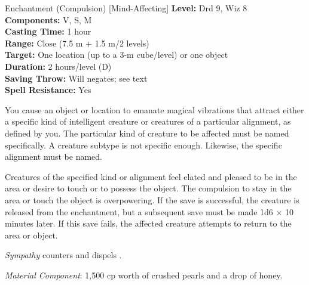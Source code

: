 {Enchantment (Compulsion) [Mind-Affecting]}
{
	\textbf{Level:}
	Drd 9, Wiz 8\\
	\textbf{Components:}
	V, S, M\\
	\textbf{Casting Time:}
	1 hour\\
	\textbf{Range:}
	Close (7.5 m + 1.5 m/2 levels)\\
	\textbf{Target:}
	One location (up to a 3-m cube/level) or one object\\
	\textbf{Duration:}
	2 hours/level (D)\\
	\textbf{Saving Throw:}
	Will negates; see text\\
	\textbf{Spell Resistance:}
	Yes\\
}
{
	You cause an object or location to emanate magical vibrations that attract either a specific kind of intelligent creature or creatures of a particular alignment, as defined by you. The particular kind of creature to be affected must be named specifically. A creature subtype is not specific enough. Likewise, the specific alignment must be named.

	Creatures of the specified kind or alignment feel elated and pleased to be in the area or desire to touch or to possess the object. The compulsion to stay in the area or touch the object is overpowering. If the save is successful, the creature is released from the enchantment, but a subsequent save must be made 1d6 $\times$ 10 minutes later. If this save fails, the affected creature attempts to return to the area or object.

	\emph{Sympathy} counters and dispels .

	\textit{Material Component}:
	1,500 cp worth of crushed pearls and a drop of honey.

}
